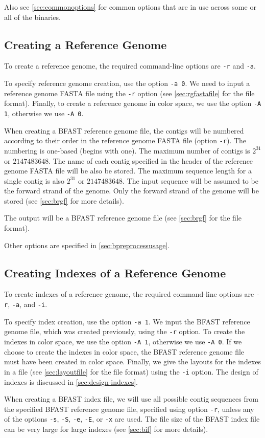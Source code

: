 \documentclass[a4paper,12pt]{book}
\newcommand{\TT}[1]{{\tt #1}} %
\newcommand{\rGFF}{reference genome FASTA file}
\newcommand{\BRGF}{BFAST reference genome file} %
\newcommand{\BIF}{BFAST index file} %
\begin{document}
Also see \autoref{sec:commonoptions} for common options that are in use across some or all of the binaries.
\subsection{Creating a Reference Genome}
\label{sec:creating-a-rg}
To create a reference genome, the required command-line options are \TT{-r} and \TT{-a}.

To specify reference genome creation, use the option \TT{-a 0}.
We need to input a \rGFF{} using the \TT{-r} option (see \autoref{sec:rgfastafile} for the file format).
Finally, to create a reference genome in color space, we use the option \TT{-A 1}, otherwise we use \TT{-A 0}.

When creating a \BRGF{}, the contigs will be numbered according to their order in the \rGFF{} (option \TT{-r}).
The numbering is one-based (begins with one).
The maximum number of contigs is $2^{31}$ or $2147483648$.
The name of each contig specified in the header of the \rGFF{} will be also be stored.
The maximum sequence length for a single contig is also $2^{31}$ or $2147483648$. 
The input sequence will be assumed to be the forward strand of the genome.
Only the forward strand of the genome will be stored (see \autoref{sec:brgf} for more details).

The output will be a \BRGF{} (see \autoref{sec:brgf} for the file format).

Other options are specified in \autoref{sec:bpreprocessusage}.
\subsection{Creating Indexes of a Reference Genome}
\label{sec:creating-bifs}
To create indexes of a reference genome, the required command-line options are \TT{-r}, \TT{-a}, and \TT{-i}.

To specify index creation, use the option \TT{-a 1}.
We input the \BRGF{}, which was created previously, using the \TT{-r} option.
To create the indexes in color space, we use the option \TT{-A 1}, otherwise we use \TT{-A 0}.
If we choose to create the indexes in color space, the \BRGF{} must have been created in color space.
Finally, we give the layouts for the indexes in a file (see \autoref{sec:layoutfile} for the file format) using the \TT{-i} option.
The design of indexes is discussed in \autoref{sec:design-indexes}.

When creating a \BIF{}, we will use all possible contig sequences from the specified \BRGF{}, specified using option \TT{-r}, unless any of the options \TT{-s}, \TT{-S}, \TT{-e}, \TT{-E}, or \TT{-x} are used.
The file size of the \BIF{} can be very large for large indexes (see \autoref{sec:bif} for more details).
\end{document}
